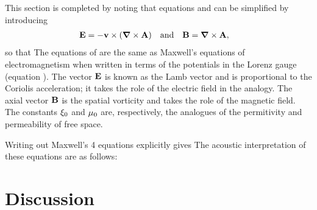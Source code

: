 This section is completed by noting that equations  and  can be simplified by introducing
\begin{align}
  \mathbf{E} &= - \textbf{v} \times \left(  \mbox{\boldmath $\nabla$} \times \textbf{A} \right) &\text{and}&&
  \mathbf{B} &= \mbox{\boldmath $\nabla$} \times \textbf{A},
\end{align}
so that
The equations of  are the same as  Maxwell's equations of electromagnetism when written in terms of the potentials in the Lorenz gauge\cite{Doran2003}
(equation ).
The vector $\mathbf{E}$ is known as the Lamb vector and is proportional to the Coriolis acceleration;
 it takes the role of the electric field in the analogy.
The axial vector $\mathbf{B}$ is the spatial vorticity and takes the role of the magnetic field.
The constants $\xi_0$ and $\mu_0$ are, respectively, the analogues of the permitivity and permeability of free space.

Writing out Maxwell's 4 equations explicitly gives
The acoustic interpretation of these equations are as follows:



\section{Discussion}\label{sec:discussion}

